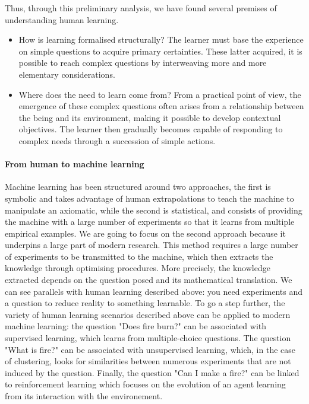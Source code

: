 Thus, through this preliminary analysis, we have found several premises of understanding human learning.

\begin{itemize}
    \item How is learning formalised structurally?
    The learner must base the experience on simple questions to acquire primary certainties. These latter acquired, it is possible to reach complex questions by interweaving more and more elementary considerations.
    \item Where does the need to learn come from?
    From a practical point of view, the emergence of these complex questions often arises from a relationship between the being and its environment, making it possible to develop contextual objectives. The learner then gradually becomes capable of responding to complex needs through a succession of simple actions.
\end{itemize}
 
\paragraph{From human to machine learning} 

Machine learning has been structured around two approaches, the first is symbolic and takes advantage of human extrapolations to teach the machine to manipulate an axiomatic, while the second is statistical, and consists of providing the machine with a large number of experiments so that it learns from multiple empirical examples. We are going to focus on the second approach because it underpins a large part of modern research.
This method requires a large number of experiments to be transmitted to the machine, which then extracts the knowledge through optimising procedures. More precisely, the knowledge extracted depends on the question posed and its mathematical translation. We can see parallels with human learning described above: you need experiments and a question to reduce reality to something learnable. To go a step further, the variety of human learning scenarios described above can be applied to modern machine learning: the question "Does fire burn?" can be associated with supervised learning, which learns from multiple-choice questions. The question "What is fire?" can be associated with unsupervised learning, which, in the case of clustering, looks for similarities between numerous experiments that are not induced by the question. Finally, the question "Can I make a fire?" can be linked to reinforcement learning which focuses on the evolution of an agent learning from its interaction with the environement.

